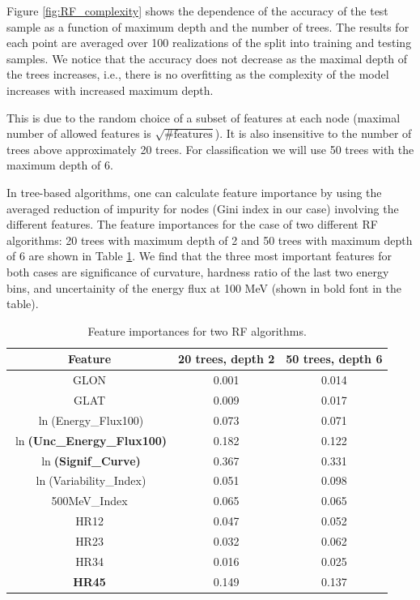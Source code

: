 Figure \ref{fig:RF_complexity} shows the dependence of the accuracy of the test sample as a function of maximum depth and the number of trees. 
The results for each point are averaged over 100 realizations of the split into training and testing samples.
We notice that the accuracy does not decrease as the maximal depth of the trees increases, i.e., there is no overfitting as the complexity of the model increases with increased maximum depth.

This is due to the random choice of a subset of features at each node (maximal number of allowed features is $\sqrt{\text{\# features}}$).
It is also insensitive to the number of trees above approximately 20 trees.
For classification we will use 50 trees with the maximum depth of 6.

In tree-based algorithms, one can calculate feature importance by using the averaged reduction of impurity for nodes (Gini index in our case) involving the different features. 
The feature importances for the case of two different RF algorithms: 20 trees with maximum depth of 2 and 50 trees with maximum depth of 6 are shown in Table \ref{tab:feat_imp}.
We find that the three most important features for both cases are significance of curvature, hardness ratio of the last two energy bins, and uncertainity of the energy flux at 100 MeV (shown in bold font in the table).



\begin{table}[!h]
    \tiny
    \centering
    \renewcommand{\tabcolsep}{1mm}
\renewcommand{\arraystretch}{1}


    \begin{tabular}{c c c}
    \hline
    \hline
    Feature &  20 trees, depth 2& 50 trees, depth 6\\
    \hline
    GLON & 0.001 & 0.014        \\
    GLAT & 0.009     & 0.017 \\
   $\ln$(Energy\_Flux100) & 0.073   &   0.071\\
    {\bf $\ln$(Unc\_Energy\_Flux100)} & 0.182 &0.122  \\
   {\bf$\ln$(Signif\_Curve)}&  0.367  &  0.331  \\
    $\ln$(Variability\_Index)& 0.051 &0.098 \\
     500MeV\_Index& 0.065 &0.065 \\
    HR12& 0.047 &0.052 \\
   HR23 & 0.032 &0.062 \\
    HR34&0.016&0.025\\
{\bf HR45}&0.149&0.137\\
\hline
    \end{tabular}
    \vspace{0.4cm}
    \caption{Feature importances for two RF algorithms.}
    \label{tab:feat_imp}
\end{table}


